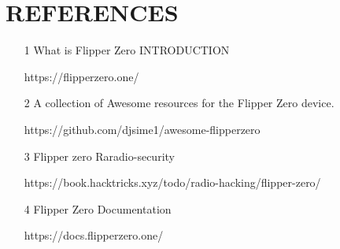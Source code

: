 \documentclass[a4paper,11pt]{report}
\begin{document}
\chapter{REFERENCES}
\begin{itemize}
\item [1] What is Flipper Zero INTRODUCTION  
                                                                     
https://flipperzero.one/    
\item[2] A collection of Awesome resources for the Flipper Zero device.

https://github.com/djsime1/awesome-flipperzero
\item[3] Flipper zero Raradio-security

https://book.hacktricks.xyz/todo/radio-hacking/flipper-zero/

\item[4] Flipper Zero Documentation

https://docs.flipperzero.one/
\vspace{12pt}
\end{itemize}
\end{document}

